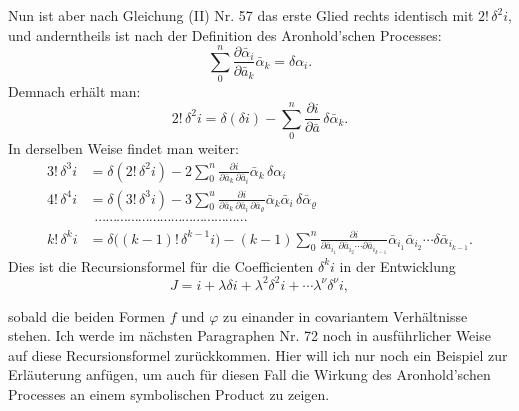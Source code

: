 \documentclass[11pt]{article}
\providecommand{\weberpage}[1]{}
\begin{document}
Nun ist aber nach Gleichung (II) Nr. 57 das erste Glied rechts identisch mit $2!\,\delta^2 i$, und anderntheils ist nach der Definition des Aronhold'schen Processes:
\[
\sum_0^n \frac{\partial \bar\alpha_i}{\partial \bar a_k}\bar\alpha_k = \delta\alpha_i.
\]
Demnach erhält man:
\[
2!\,\delta^2 i = \delta(\delta i) - \sum_0^n \frac{\partial i}{\partial \bar a}\,\delta\bar\alpha_k.
\]
In derselben Weise findet man weiter:
\[
\begin{aligned}
3!\,\delta^3 i &= \delta(2!\,\delta^2 i) - 2\sum_0^n \frac{\partial i}{\partial \bar a_k\,\partial \bar a_i}\bar\alpha_k\,\delta\alpha_i\\
4!\,\delta^4 i &= \delta(3!\,\delta^3 i) - 3\sum_0^u \frac{\partial i}{\partial \bar a_k\,\partial \bar a_i\,\partial \bar a_\varrho}\bar\alpha_k\bar\alpha_i\,\delta\bar\alpha_\varrho\\
&\ \ \cdots\cdots\cdots\cdots\cdots\cdots\cdots\cdots\cdots\cdots\cdots\cdots\cdots\cdots\\
k!\,\delta^k i &= \delta\big((k-1)!\,\delta^{k-1}i\big) - (k-1)\sum_0^n \frac{\partial i}{\partial \bar a_{i_1}\,\partial \bar a_{i_2}\cdots \partial \bar a_{i_{k-1}}}\bar\alpha_{i_1}\bar\alpha_{i_2}\cdots \delta\bar\alpha_{i_{k-1}}.
\end{aligned}
\]
Dies ist die Recursionsformel für die Coefficienten $\delta^k i$ in der Entwicklung
\[
J = i + \lambda\delta i + \lambda^2\delta^2 i + \cdots \lambda^\nu \delta^\nu i,
\]


\weberpage{68}
sobald die beiden Formen $f$ und $\varphi$ zu einander in covariantem Verhältnisse stehen. Ich werde im nächsten Paragraphen Nr. 72 noch in ausführlicher Weise auf diese Recursionsformel zurückkommen. Hier will ich nur noch ein Beispiel zur Erläuterung anfügen, um auch für diesen Fall die Wirkung des Aronhold'schen Processes an einem symbolischen Product zu zeigen.
\end{document}
